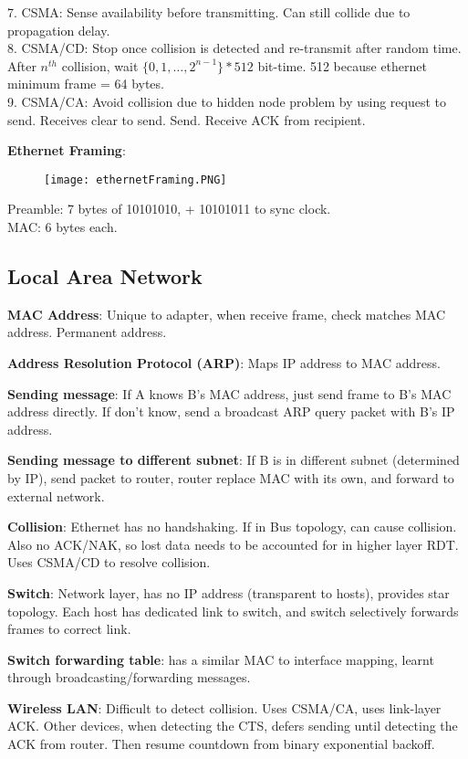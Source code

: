 \documentclass[a4paper,landscape]{article}
\newcommand{\rntopic}[1]{\vspace{-2.0em}\subsection*{#1}\vspace{-1.0em}}
\newcommand{\rnname}[1]{\textbf{#1}}
\begin{document}
\begin{multicols*}{4}
\begin{flatitemize}
7. CSMA: Sense availability before transmitting. Can still collide due to propagation delay. \\
8. CSMA/CD: Stop once collision is detected and re-transmit after random time. After $n^{th}$ collision, wait $\{0, 1, \dots, 2^{n-1}\} * 512$ bit-time. 512 because ethernet minimum frame = 64 bytes.\\
9. CSMA/CA: Avoid collision due to hidden node problem by using request to send. Receives clear to send. Send. Receive ACK from recipient.
\item \rnname{Ethernet Framing}: 
\vspace{-0.3cm}
    \begin{figure}[H]
      \texttt{[image: ethernetFraming.PNG]}
    \end{figure}
\vspace{-0.4cm}
Preamble: 7 bytes of 10101010, + 10101011 to sync clock.\\
MAC: 6 bytes each.
\end{flatitemize}
\rntopic{Local Area Network}
\begin{flatitemize}
\item \rnname{MAC Address}: Unique to adapter, when receive frame, check matches MAC address. Permanent address.
\item \rnname{Address Resolution Protocol (ARP)}: Maps IP address to MAC address.
\item \rnname{Sending message}: If A knows B's MAC address, just send frame to B's MAC address directly. If don't know, send a broadcast ARP query packet with B's IP address.
\item \rnname{Sending message to different subnet}: If B is in different subnet (determined by IP), send packet to router, router replace MAC with its own, and forward to external network.
\item \rnname{Collision}: Ethernet has no handshaking. If in Bus topology, can cause collision. Also no ACK/NAK, so lost data needs to be accounted for in higher layer RDT. Uses CSMA/CD to resolve collision.
\item \rnname{Switch}: Network layer, has no IP address (transparent to hosts), provides star topology. Each host has dedicated link to switch, and switch selectively forwards frames to correct link.
\item \rnname{Switch forwarding table}: has a similar MAC to interface mapping, learnt through broadcasting/forwarding messages.
\item \rnname{Wireless LAN}: Difficult to detect collision. Uses CSMA/CA, uses link-layer ACK. Other devices, when detecting the CTS, defers sending until detecting the ACK from router. Then resume countdown from binary exponential backoff.

\end{flatitemize}
\end{multicols*}
\end{document}
